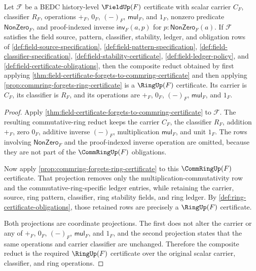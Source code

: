 \begin{corollary}
\label{cor:field-certificate-forgets-to-ring-certificate}
Let $\mathcal F$ be a BEDC history-level $\FieldUp(F)$ certificate with scalar
carrier $C_F$, classifier $R_F$, operations $+_F$, $0_F$, $(-)_F$,
$\mathsf{mul}_F$, and $1_F$, nonzero predicate $\mathsf{NonZero}_F$, and
proof-indexed inverse $\mathsf{inv}_F(a,p)$ for
$p:\mathsf{NonZero}_F(a)$. If $\mathcal F$ satisfies the field source,
pattern, classifier, stability, ledger, and obligation rows of
\autoref{def:field-source-specification},
\autoref{def:field-pattern-specification},
\autoref{def:field-classifier-specification},
\autoref{def:field-stability-certificate},
\autoref{def:field-ledger-policy}, and
\autoref{def:field-certificate-obligations}, then the composite reduct obtained
by first applying \autoref{thm:field-certificate-forgets-to-commring-certificate}
and then applying \autoref{prop:commring-forgets-ring-certificate} is a
$\RingUp(F)$ certificate. Its carrier is $C_F$, its classifier is $R_F$, and
its operations are $+_F$, $0_F$, $(-)_F$, $\mathsf{mul}_F$, and $1_F$.
\end{corollary}
\begin{proof}
Apply \autoref{thm:field-certificate-forgets-to-commring-certificate} to
$\mathcal F$. The resulting commutative-ring reduct keeps the carrier $C_F$,
the classifier $R_F$, addition $+_F$, zero $0_F$, additive inverse $(-)_F$,
multiplication $\mathsf{mul}_F$, and unit $1_F$. The rows involving
$\mathsf{NonZero}_F$ and the proof-indexed inverse operation are omitted,
because they are not part of the $\CommRingUp(F)$ obligations.

Now apply \autoref{prop:commring-forgets-ring-certificate} to this
$\CommRingUp(F)$ certificate. That projection removes only the
multiplication-commutativity row and the commutative-ring-specific ledger
entries, while retaining the carrier, source, ring pattern, classifier, ring
stability fields, and ring ledger. By \autoref{def:ring-certificate-obligations},
those retained rows are precisely a $\RingUp(F)$ certificate.

Both projections are coordinate projections. The first does not alter the
carrier or any of $+_F$, $0_F$, $(-)_F$, $\mathsf{mul}_F$, and $1_F$, and the
second projection states that the same operations and carrier classifier are
unchanged. Therefore the composite reduct is the required $\RingUp(F)$
certificate over the original scalar carrier, classifier, and ring operations.
\end{proof}

